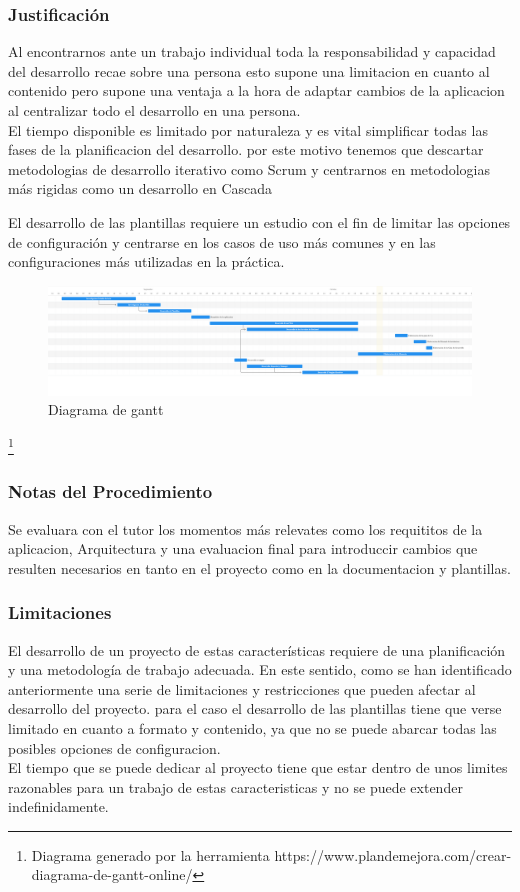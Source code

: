 \documentclass[12pt, a4paper, twoside]{article}
\begin{document}
\subsubsection{Justificación}
Al encontrarnos ante un trabajo individual toda la responsabilidad y capacidad del desarrollo recae sobre una persona esto supone una limitacion en cuanto al contenido pero supone una ventaja 
a la hora de adaptar cambios de la aplicacion al centralizar todo el desarrollo en una persona. \\ 
El tiempo disponible es limitado por naturaleza y es vital simplificar todas las fases de la planificacion del desarrollo. por este motivo tenemos que 
descartar metodologias de desarrollo iterativo como Scrum y centrarnos en metodologias más rigidas como un desarrollo en Cascada

El desarrollo de las plantillas requiere un estudio con el fin de limitar las opciones de configuración y centrarse en los casos de uso más comunes y en las configuraciones más utilizadas en la práctica.

\begin{figure}[ht]
	\centering
		\includegraphics[width=1\textwidth]{gantt.png} 
	\caption{Diagrama de gantt} 
\end{figure}
\footnote{Diagrama generado por la herramienta https://www.plandemejora.com/crear-diagrama-de-gantt-online/}
\subsubsection{Notas del Procedimiento}
Se evaluara con el tutor los momentos más relevates como los requititos de la aplicacion, Arquitectura y una evaluacion final para introduccir cambios que resulten necesarios en tanto en el proyecto como 
en la documentacion y plantillas.

\subsubsection{Limitaciones}
El desarrollo de un proyecto de estas características requiere de una planificación y una metodología de trabajo adecuada.
En este sentido, como se han identificado anteriormente una serie de limitaciones y restricciones que pueden afectar al desarrollo del proyecto.
para el caso el desarrollo de las plantillas tiene que verse limitado en cuanto a formato y contenido, ya que no se puede abarcar todas las posibles opciones de configuracion.
\\El tiempo que se puede dedicar al proyecto tiene que estar dentro de unos limites razonables para un trabajo de estas caracteristicas y no se puede extender indefinidamente.
\end{document}
